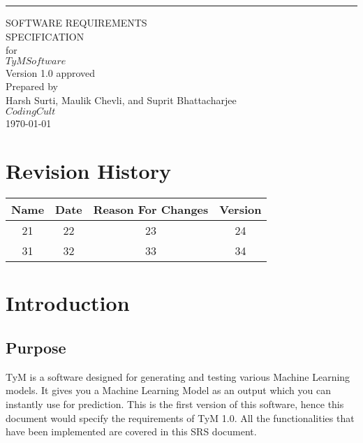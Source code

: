 \documentclass[12pt]{scrreprt}
\date{}
\def\myversion{1.0 }
\begin{document}
\begin{flushright}
    \rule{16cm}{5pt}\vskip1cm
    \begin{bfseries}
        \Huge{SOFTWARE REQUIREMENTS\\ SPECIFICATION}\\
        \vspace{1.9cm}
        for\\
        \vspace{1.9cm}
        $TyM Software$\\
        \vspace{1.9cm}
        \LARGE{Version \myversion approved}\\
        \vspace{1.9cm}
        Prepared by \\ Harsh Surti, Maulik Chevli, and Suprit Bhattacharjee\\
        \vspace{1.9cm}
        $Coding Cult$\\
        \vspace{1.9cm}
        \today\\
    \end{bfseries}
\end{flushright}

\tableofcontents


\chapter*{Revision History}

\begin{center}
    \begin{tabular}{|c|c|c|c|}
        \hline
	    Name & Date & Reason For Changes & Version\\
        \hline
	    21 & 22 & 23 & 24\\
        \hline
	    31 & 32 & 33 & 34\\
        \hline
    \end{tabular}
\end{center}

\chapter{Introduction}

\section{Purpose}
TyM is a software designed for generating and testing various Machine Learning models. It gives you a Machine Learning Model as an output which you can instantly use for prediction. This is the first version of this software, hence this document would specify the requirements of TyM 1.0. All the functionalities that have been implemented are covered in this SRS document.
\end{document}
